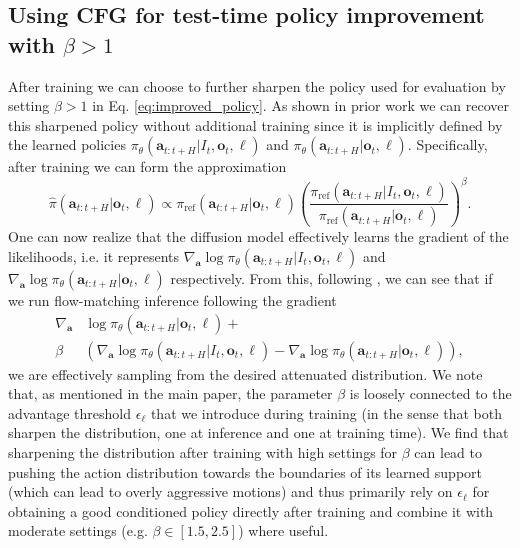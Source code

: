 \documentclass[conference]{IEEEtran}
\newcommand{\ba}{\mathbf{a}}
\newcommand{\bo}{\mathbf{o}}
\newcommand{\lang}{\ell}
\newcommand{\piref}{\pi_\text{ref}}
\begin{document}
\subsection{Using CFG for test-time policy improvement with $\beta > 1$}
\label{sect:cfg}
After training we can choose to further sharpen the policy used for evaluation by setting $\beta > 1$ in Eq. \eqref{eq:improved_policy}. As shown in prior work \citep{Frans2025DiffusionGuidance} we can recover this sharpened policy without additional training since it is implicitly defined by the learned policies 
$\pi_\theta(\ba_{t:t+H} \vert I_t, \bo_t, \lang)$ and $\pi_\theta(\ba_{t:t+H} \vert \bo_t, \lang)$.
Specifically, after training we can form the approximation
\begin{equation}
      \hat{\pi}(\ba_{t:t+H} \vert \bo_t, \lang) \propto \piref(\ba_{t:t+H} \vert \bo_t, \lang) \left( \frac{\piref(\ba_{t:t+H} \vert I_t, \bo_t, \lang)}{\piref(\ba_{t:t+H} \vert \bo_t, \lang)} \right)^\beta.
\end{equation}
One can now realize that the diffusion model effectively learns the gradient of the likelihoods, i.e. it represents $\nabla_\ba \log \pi_\theta(\ba_{t:t+H} \vert I_t, \bo_t, \lang)$ and $\nabla_\ba \log \pi_\theta(\ba_{t:t+H} \vert \bo_t, \lang)$ respectively. From this, following \citet{Frans2025DiffusionGuidance}, we can see that if we run flow-matching inference following the gradient
\begin{equation}
\begin{aligned}
    \nabla_\ba &\log \pi_\theta(\ba_{t:t+H} \vert \bo_t, \lang) + \\ 
    \beta &( \nabla_\ba \log \pi_\theta(\ba_{t:t+H} \vert I_t, \bo_t, \lang) - \nabla_\ba \log \pi_\theta(\ba_{t:t+H} \vert \bo_t, \lang)),
\end{aligned}
\end{equation}
we are effectively sampling from the desired attenuated distribution. We note that, as mentioned in the main paper, the parameter $\beta$ is loosely connected to the advantage threshold $\epsilon_\lang$ that we introduce during training (in the sense that both sharpen the distribution, one at inference and one at training  time). We find that sharpening the distribution after training with high settings for $\beta$ can lead to pushing the action distribution towards the boundaries of its learned support (which can lead to overly aggressive motions) and thus primarily rely on $\epsilon_\lang$ for obtaining a good conditioned policy directly after training and combine it with moderate settings (e.g. $\beta \in [1.5, 2.5]$) where useful.
\end{document}
